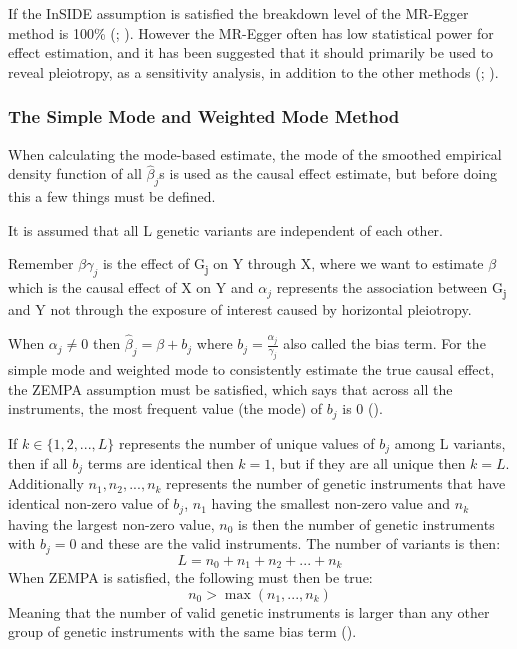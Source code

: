 \documentclass[
]{article}
\begin{document}
If the InSIDE assumption is satisfied the breakdown level of the
MR-Egger method is 100\% (;
). However
the MR-Egger often has low statistical power for effect estimation, and
it has been suggested that it should primarily be used to reveal
pleiotropy, as a sensitivity analysis, in addition to the other methods
(;
).

\subsubsection{\texorpdfstring{\textbf{The Simple Mode and Weighted Mode
Method}}{The Simple Mode and Weighted Mode Method}}\label{the-simple-mode-and-weighted-mode-method}

When calculating the mode-based estimate, the mode of the smoothed
empirical density function of all \(\hat\beta_j\)s is used as the causal
effect estimate, but before doing this a few things must be defined.

It is assumed that all L genetic variants are independent of each other.

Remember \(\beta\gamma_j\) is the effect of G\textsubscript{j} on Y
through X, where we want to estimate \(\beta\) which is the causal
effect of X on Y and \(\alpha_j\) represents the association between
G\textsubscript{j} and Y not through the exposure of interest caused by
horizontal pleiotropy.

When \(\alpha_j\ne0\) then \(\hat\beta_j=\beta+b_j\) where
\(b_j=\frac{\alpha_j}{\gamma_j}\) also called the bias term. For the
simple mode and weighted mode to consistently estimate the true causal
effect, the ZEMPA assumption must be satisfied, which says that across
all the instruments, the most frequent value (the mode) of \(b_j\) is 0
().

If \(k\in\{1,2,...,L\}\) represents the number of unique values of
\(b_j\) among L variants, then if all \(b_j\) terms are identical then
\(k=1\), but if they are all unique then \(k=L\). Additionally
\(n_1,n_2,...,n_k\) represents the number of genetic instruments that
have identical non-zero value of \(b_j\), \(n_1\) having the smallest
non-zero value and \(n_k\) having the largest non-zero value, \(n_0\) is
then the number of genetic instruments with \(b_j=0\) and these are the
valid instruments. The number of variants is then:
\[L=n_0+n_1+n_2+...+n_k\tag{15}\] When ZEMPA is satisfied, the following
must then be true: \[n_0>\max(n_1,...,n_k)\tag{16}\] Meaning that the
number of valid genetic instruments is larger than any other group of
genetic instruments with the same bias term
().
\end{document}

